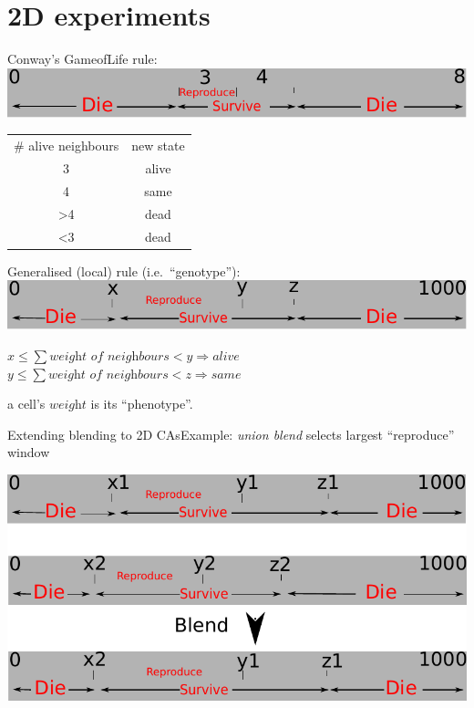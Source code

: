 \part{2D experiments}
\frame{\partpage}

\begin{frame}{}{}
\vspace*{-1cm}
\begin{center}
\item{Conway's {Game\bsp of\bsp Life} rule:}\vspace*{.1cm}
\includegraphics[width=.9\textwidth]{conway.pdf}
\item{
\begin{fminipage}{7cm}
\begin{tabular}{cc}
\# alive neighbours & new state\\
3  & alive\\
4  & same\\
>4 & dead\\
<3 & dead\\
\end{tabular}
\end{fminipage}
}
\item{Generalised (local) rule (i.e.~``genotype''):}\vspace*{.1cm}
  \includegraphics[width=.9\textwidth]{2dgenotype.pdf}
\begin{fminipage}{8.2cm}
$x\leq\sum \textit{weight\ of\ neighbours}<y\Rightarrow\textit{alive}$\newline
$y\leq\sum \textit{weight\ of\ neighbours}<z\Rightarrow\textit{same}$
\end{fminipage}
a cell's $\textit{weight}$ is its ``phenotype''.
\end{center}
\end{frame}

\begin{frame}{Extending blending to 2D CAs}{Example: \emph{union blend} selects largest ``reproduce'' window}
\begin{center}
\includegraphics[width=.9\textwidth]{2dgenotypeblend.pdf}
\end{center}
\end{frame}


